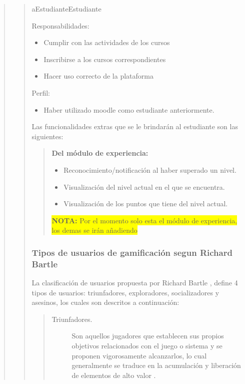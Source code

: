 \begin{quote}
\begin{quote}
\begin{actor}{aEstudiante}{Estudiante}
    \item[Responsabilidades:] \hfill
        \begin{itemize}
        \item Cumplir con las actividades de los cursos
        \item Inscribirse a los cursos correspondientes
        \item Hacer uso correcto de la plataforma
        \end{itemize}

    \item[Perfil:] \hfill
        \begin{itemize}
        \item Haber utilizado moodle como estudiante anteriormente.
        \end{itemize}
    \end{actor}

    \noindent
    Las funcionalidades extras que se le brindarán al estudiante son las siguientes:

    \begin{quote}
    {\bf Del módulo de experiencia:}
        \begin{itemize}
        \item Reconocimiento/notificación al haber superado un nivel.
        \item Visualización del nivel actual en el que se encuentra.
        \item Visualización de los puntos que tiene del nivel actual.
        \end{itemize}
\par\bigskip\noindent\colorbox{yellow}{%
{\bf NOTA:} Por el momento solo esta el módulo de experiencia, los demas se irán añadiendo}
    \end{quote}

    \subsubsection{Tipos de usuarios de gamificación segun Richard Bartle}

    La clasificación de usuarios propuesta por Richard Bartle \cite{BartleUsuarios}, define
    4 tipos de usuarios: triunfadores, exploradores, socializadores y asesinos, los cuales son
    descritos a continuación:

        \begin{quote}
        \begin{description}
        \item[Triunfadores.]
            Son aquellos jugadores que establecen sus propios objetivos relacionados con
            el juego o sistema y se proponen vigorosamente alcanzarlos, lo cual generalmente
            se traduce en la acumulación y liberación de elementos de alto valor
            \cite[p. 3]{BartleUsuarios}.


\end{description}
\end{quote}
\end{quote}
\end{quote}
